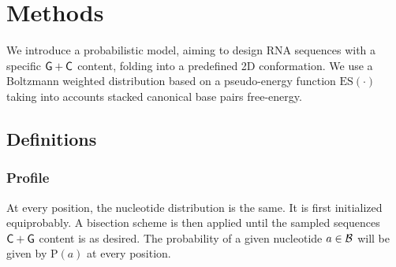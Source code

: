 \section{Methods}
\label{sec:methods}

\newcommand{\PE}[1]{E(#1)}
\newcommand{\EI}{\text{EI}}
\newcommand{\ES}{\text{ES}}
\newcommand{\ISO}{\text{ISO}}
\newcommand{\Prob}{\text{P}}

We introduce a probabilistic model, aiming to design RNA sequences with a 
specific ${\sf{G}}+{\sf{C}}$ content, folding into a predefined 2D conformation.
We use a Boltzmann weighted distribution based on a pseudo-energy function 
$\ES(\cdot)$ taking into accounts stacked canonical base pairs free-energy. 


%
%
\subsection{Definitions}
\subsubsection{Profile}
At every position, the nucleotide distribution is the same. 
It is first initialized equiprobably. A bisection scheme is then applied until the sampled sequences ${\sf{C}}+{\sf{G}}$ content is as desired. The probability
of a given nucleotide $a\in\mathcal{B}$ will be given by $\Prob(a)$ at every 
position.


